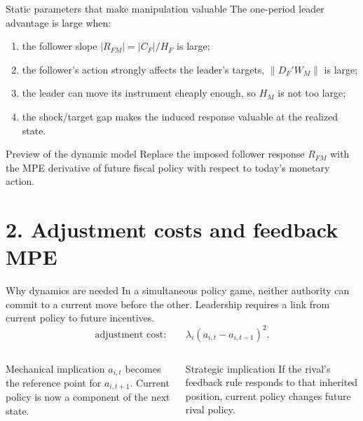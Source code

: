 \documentclass[10pt,aspectratio=169]{beamer}
\newcommand{\norm}[1]{\left\lVert#1\right\rVert}
\begin{document}
\begin{frame}{Static parameters that make manipulation valuable}
The one-period leader advantage is large when:
\begin{enumerate}
  \item the follower slope $|R_{FM}|=|C_F|/H_F$ is large;
  \item the follower's action strongly affects the leader's targets,
        $\norm{D_F'W_M}$ is large;
  \item the leader can move its instrument cheaply enough, so $H_M$ is not too
        large;
  \item the shock/target gap makes the induced response valuable at the
        realized state.
\end{enumerate}
\begin{exampleblock}{Preview of the dynamic model}
Replace the imposed follower response $R_{FM}$ with the MPE derivative of
future fiscal policy with respect to today's monetary action.
\end{exampleblock}
\end{frame}

\section{2. Adjustment costs and feedback MPE}

\begin{frame}{Why dynamics are needed}
In a simultaneous policy game, neither authority can commit to a current move
before the other. Leadership requires a link from current policy to future
incentives.
\vspace{0.3cm}
\begin{equation*}
\boxed{\text{adjustment cost:}\qquad
\lambda_i(a_{i,t}-a_{i,t-1})^2.}
\end{equation*}
\begin{columns}[T,onlytextwidth]
\begin{block}{Mechanical implication}
$a_{i,t}$ becomes the reference point for $a_{i,t+1}$. Current policy is now a
component of the next state.
\end{block}
\begin{alertblock}{Strategic implication}
If the rival's feedback rule responds to that inherited position, current
policy changes future rival policy.
\end{alertblock}
\end{columns}
\end{frame}
\end{document}
